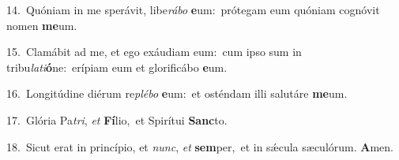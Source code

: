 {\numbfont\textcolor{\numbcolor}{14.}}~Quóniam in me sperávit, libe\-\textit{rá}\-\textit{bo} \textbf{e}\-um:~\star prótegam eum quóniam cognóvit nomen \textbf{me}\-um.\par
{\numbfont\textcolor{\numbcolor}{15.}}~Clamábit ad me, et ego exáudiam eum:~\dagger cum ipso sum in tribu\-\textit{la}\-\textit{ti}\textbf{ó}ne:~\star erípiam eum et glorificábo \textbf{e}\-um.\par
{\numbfont\textcolor{\numbcolor}{16.}}~Longitúdine diérum re\-\textit{plé}\-\textit{bo} \textbf{e}\-um:~\star et osténdam illi salutáre \textbf{me}\-um.\par
{\numbfont\textcolor{\numbcolor}{17.}}~Glória Pa\-\textit{tri}\-, \textit{et} \textbf{Fí}\-lio,~\star et Spirítui \textbf{Sanc}\-to.\par
{\numbfont\textcolor{\numbcolor}{18.}}~Sicut erat in princípio, et \textit{nunc}\-, \textit{et} \textbf{sem}\-per,~\star et in sǽcula sæculórum. \textbf{A}\-men.\par
